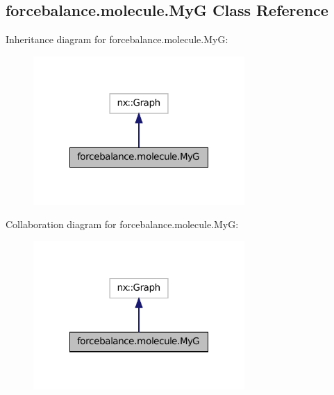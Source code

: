 \hypertarget{classforcebalance_1_1molecule_1_1MyG}{\subsection{forcebalance.\-molecule.\-My\-G Class Reference}
\label{classforcebalance_1_1molecule_1_1MyG}
}


Inheritance diagram for forcebalance.\-molecule.\-My\-G\-:
\nopagebreak
\begin{figure}[H]
\begin{center}
\leavevmode
\includegraphics[width=228pt]{classforcebalance_1_1molecule_1_1MyG__inherit__graph}
\end{center}
\end{figure}


Collaboration diagram for forcebalance.\-molecule.\-My\-G\-:
\nopagebreak
\begin{figure}[H]
\begin{center}
\leavevmode
\includegraphics[width=228pt]{classforcebalance_1_1molecule_1_1MyG__coll__graph}
\end{center}
\end{figure}
